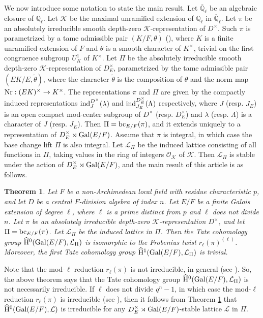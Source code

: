 \documentclass[10pt, reqno]{amsart}
\theoremstyle{plain}
\numberwithin{equation}{section}
\newtheorem{theorem}{Theorem}[section]
\begin{document}
We now introduce some notation to state the main result. Let $\overline{\mathbb{Q}}_\ell$ be an algebraic closure of $\mathbb{Q}_\ell$. Let $\mathcal{K}$ be the maximal unramified extension of $\mathbb{Q}_\ell$ in $\overline{\mathbb{Q}}_\ell$. Let $\pi$ be an absolutely irreducible smooth depth-zero $\mathcal{K}$-representation of $D^\times$. Such $\pi$ is parametrized by a tame admissible pair $(K/F,\theta)$ (\cite[Subsection 1.5]{BH_depth_zero}), where $K$ is a finite unramified extension of $F$ and $\theta$ is a smooth character of $K^\times$, trivial on the first congruence subgroup $U_K^1$ of $K^\times$. Let $\Pi$ be the absolutely irreducible smooth depth-zero $\mathcal{K}$-representation of $D_E^\times$, parametrized by the tame admissible pair $(EK/E,\widetilde{\theta})$, where the character $\widetilde{\theta}$ is the composition of $\theta$ and the norm map ${\rm Nr}:(EK)^\times\rightarrow K^\times$. The representations $\pi$ and $\Pi$ are given by the compactly induced representations ${\rm ind}_{J}^{D^\times}(\lambda)$ and ${\rm ind}_{J_E}^{D_E^\times}(\Lambda)$ respectively, where $J$ (resp. $J_E$) is an open compact mod-center subgroup of $D^\times$ (resp. $D_E^\times$) and $\lambda$ (resp. $\Lambda$) is a character of $J$ (resp. $J_E$). Then $\Pi = {\rm bc}_{E/F}(\pi)$, and it extends uniquely to a representation of $D_E^\times\rtimes {\rm Gal}(E/F)$. Assume that $\pi$ is integral, in which case the base change lift $\Pi$ is also integral. Let $\mathcal{L}_\Pi$ be the induced lattice consisting of all functions in $\Pi$, taking values in the ring of integers $\mathcal{O}_{\mathcal{K}}$ of $\mathcal{K}$. Then $\mathcal{L}_\Pi$ is stable under the action of $D_E^\times\rtimes {\rm Gal}(E/F)$, and the main result of this article is as follows.
\begin{theorem}\label{intro_thm}
Let $F$ be a non-Archimedean local field with residue characteristic $p$, and let $D$ be a central $F$-division algebra of index $n$. Let $E/F$ be a finite Galois extension of degree $\ell$, where $\ell$ is a prime distinct from $p$ and $\ell$ does not divide $n$. Let $\pi$ be an absolutely irreducible depth-zero $\mathcal{K}$-representation $D^\times$, and let $\Pi = {\rm bc}_{E/F}(\pi)$. Let $\mathcal{L}_\Pi$ be the induced lattice in $\Pi$. Then the Tate cohomology group $\widehat{\rm H}^0({\rm Gal}(E/F),\mathcal{L}_\Pi)$ is isomorphic to the Frobenius twist $r_\ell(\pi)^{(\ell)}$. Moreover, the first Tate cohomology group $\widehat{\rm H}^1({\rm Gal}(E/F),\mathcal{L}_\Pi)$ is trivial.
\end{theorem}
Note that the mod-$\ell$ reduction $r_\ell(\pi)$ is not irreducible, in general (see \cite[Corollary 3.24]{modular_type_inner}). So, the above theorem says that the Tate cohomology group $\widehat{\rm H}^0({\rm Gal}(E/F),\mathcal{L}_\Pi)$ is not necessarily irreducible. If $\ell$ does not divide $q^n-1$, in which case the mod-$\ell$ reduction $r_\ell(\pi)$ is irreducible (see \cite[Corollary 3.22]{modular_type_inner}), then it follows from Theorem \ref{intro_thm} that $\widehat{\rm H}^0({\rm Gal}(E/F),\mathcal{L})$ is irreducible for any $D_E^\times\rtimes {\rm Gal}(E/F)$-stable lattice $\mathcal{L}$ in $\Pi$.
\end{document}
